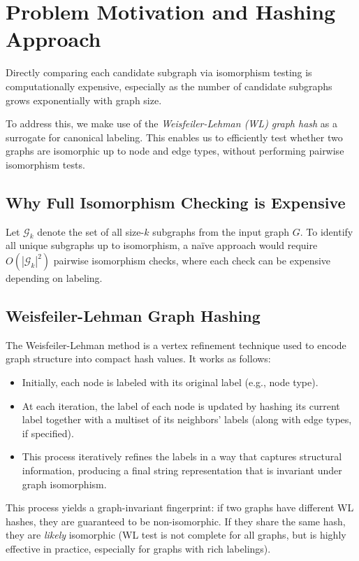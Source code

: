 \documentclass{article}
\begin{document}
\section*{Problem Motivation and Hashing Approach}

Directly comparing each candidate subgraph via isomorphism testing is computationally expensive, especially as the number of candidate subgraphs grows exponentially with graph size.

To address this, we make use of the \emph{Weisfeiler-Lehman (WL) graph hash} as a surrogate for canonical labeling. This enables us to efficiently test whether two graphs are isomorphic up to node and edge types, without performing pairwise isomorphism tests.

\subsection*{Why Full Isomorphism Checking is Expensive}

Let \( \mathcal{G}_k \) denote the set of all size-\( k \) subgraphs from the input graph \( G \). To identify all unique subgraphs up to isomorphism, a naïve approach would require \( O(|\mathcal{G}_k|^2) \) pairwise isomorphism checks, where each check can be expensive depending on labeling.

\subsection*{Weisfeiler-Lehman Graph Hashing}

The Weisfeiler-Lehman method is a vertex refinement technique used to encode graph structure into compact hash values. It works as follows:

\begin{itemize}
    \item Initially, each node is labeled with its original label (e.g., node type).
    \item At each iteration, the label of each node is updated by hashing its current label together with a multiset of its neighbors' labels (along with edge types, if specified).
    \item This process iteratively refines the labels in a way that captures structural information, producing a final string representation that is invariant under graph isomorphism.
\end{itemize}

This process yields a graph-invariant fingerprint: if two graphs have different WL hashes, they are guaranteed to be non-isomorphic. If they share the same hash, they are \emph{likely} isomorphic (WL test is not complete for all graphs, but is highly effective in practice, especially for graphs with rich labelings).
\end{document}
